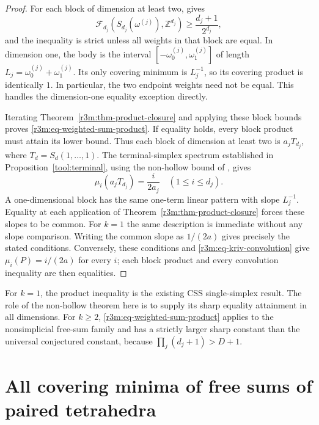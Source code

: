 \documentclass[11pt,a4paper]{article}
\theoremstyle{remark}\newtheorem{remark}[theorem]{Remark}
\begin{document}
\begin{proof}
For each block of dimension at least two,
\cite[Corollary~5.2 and its proof]{CSS} gives
\[
 \mathcal F_{d_j}(S_{d_j}(\omega^{(j)}),\mathbb Z^{d_j})
 \ge \frac{d_j+1}{2^{d_j}},
\]
and the inequality is strict unless all weights in that block are
equal.  In dimension one, the body is the interval
$[-\omega^{(j)}_0,\omega^{(j)}_1]$ of length
$L_j=\omega^{(j)}_0+\omega^{(j)}_1$.
Its only covering minimum is $L_j^{-1}$, so its covering product is
identically $1$.  In particular, the two endpoint weights need not
be equal.  This handles the dimension-one equality exception directly.

Iterating Theorem~\ref{r3m:thm-product-closure} and applying these block
bounds proves \eqref{r3m:eq-weighted-sum-product}.
If equality holds, every block product must attain its lower bound.
Thus each block of dimension at least two is
$a_jT_{d_j}$, where
$T_d=S_d(1,\ldots,1)$.
The terminal-simplex spectrum established in
Proposition~\ref{tool:terminal}, using the non-hollow bound of
\cite{VMRC200}, gives
\[
 \mu_i(a_jT_{d_j})=\frac{i}{2a_j}
       \quad(1\le i\le d_j).
\]
A one-dimensional block has the same one-term linear pattern with
slope $L_j^{-1}$.
Equality at each application of Theorem~\ref{r3m:thm-product-closure}
forces these slopes to be common.  For $k=1$ the same description is
immediate without any slope comparison.  Writing the common slope
as $1/(2a)$ gives precisely the stated conditions.
Conversely, these conditions and \eqref{r3m:eq-kriv-convolution}
give $\mu_i(P)=i/(2a)$ for every $i$; each block product and every
convolution inequality are then equalities.
\end{proof}

For $k=1$, the product inequality is the existing CSS single-simplex
result.  The role of the non-hollow theorem here is to supply its
sharp equality attainment in all dimensions.
For $k\ge2$, \eqref{r3m:eq-weighted-sum-product} applies to the
nonsimplicial free-sum family and has a strictly larger sharp constant
than the universal conjectured constant, because
$\prod_j(d_j+1)>D+1$.

\section{All covering minima of free sums of paired tetrahedra}
\label{r3m:sec-paired}
\end{document}
